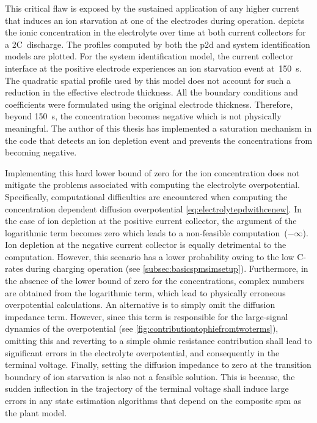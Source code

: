 This  critical flaw  is  exposed  by the  sustained  application  of any  higher
current  that  induces  an  ion  starvation at  one  of  the  electrodes  during
operation.  depicts  the  ionic concentration  in  the
electrolyte  over  time at  both  current  collectors  for a  2C~discharge.  The
profiles  computed  by  both  the \gls{p2d}  and  system  identification  models
are  plotted.  For  the  system  identification  model,  the  current  collector
interface  at  the  positive  electrode  experiences  an  ion  starvation  event
at~\approx\SI{150}{\second}. The  quadratic spatial  profile used by  this model
does not account for such a  reduction in the effective electrode thickness. All
the  boundary conditions  and coefficients  were formulated  using the  original
electrode  thickness.  Therefore,  beyond \SI{150}{\second},  the  concentration
becomes negative which  is not physically meaningful. The author  of this thesis
has implemented a saturation mechanism in the code that detects an ion depletion
event and prevents the concentrations from becoming negative.

Implementing  this  hard   lower  bound  of  zero  for   the  ion  concentration
does    not   mitigate    the   problems    associated   with    computing   the
electrolyte   overpotential.   Specifically,  computational   difficulties   are
encountered    when   computing    the    concentration   dependent    diffusion
overpotential \cref{eq:electrolytepdwithcenew}. In the case  of ion depletion at
the positive  current collector,  the argument of  the logarithmic  term becomes
zero which leads to a non-feasible computation~($-\infty$). Ion depletion at the
negative current collector  is equally detrimental to  the computation. However,
this scenario has  a lower probability owing to the  low C-rates during charging
operation (see \cref{subsec:basicspmsimsetup}).  Furthermore, in the  absence of
the lower  bound of zero  for the  concentrations, complex numbers  are obtained
from  the logarithmic  term, which  lead to  physically erroneous  overpotential
calculations. An  alternative is  to simply omit  the diffusion  impedance term.
However, since  this term is  responsible for  the large-signal dynamics  of the
overpotential (see \cref{fig:contributiontophiefromtwoterms}), omitting this and
reverting to  a simple ohmic  resistance contribution shall lead  to significant
errors  in  the electrolyte  overpotential,  and  consequently in  the  terminal
voltage.  Finally, setting  the diffusion  impedance to  zero at  the transition
boundary of ion starvation is also not a feasible solution. This is because, the
sudden inflection in  the trajectory of the terminal voltage  shall induce large
errors in any state estimation algorithms that depend on the composite \gls{spm}
as the plant model.


